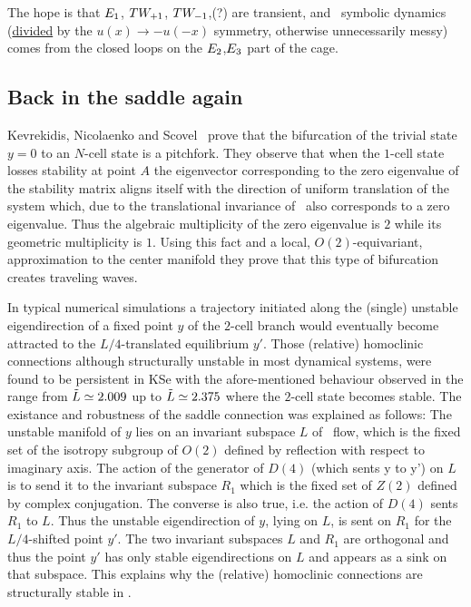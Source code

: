 The hope is that $E_{1}$, 
$TW_{+1}$,
$TW_{-1}$,(?) are transient, and \rpo\ symbolic
dynamics (\underline{divided} by the $u(x) \to - u(-x)$ symmetry, otherwise
unnecessarily messy) comes from the closed loops on 
the $E_{2}$,$E_{3}$ part of the cage.


\subsection{Back in the saddle again}

Kevrekidis, Nicolaenko and Scovel~ 
prove that the bifurcation of the trivial state $y=0$ to an $N$-cell state is a pitchfork. 
They observe that when the $1$-cell state losses stability at point $A$ the
eigenvector corresponding to the zero eigenvalue of the stability matrix aligns itself with the direction of uniform translation of the
system which, due to the translational invariance of \KSe\, also corresponds to a zero eigenvalue. Thus the algebraic multiplicity of the zero eigenvalue is $2$ while its geometric multiplicity is $1$. Using this fact and a local, $O(2)$-equivariant, approximation to the center manifold they prove that this type of bifurcation creates traveling waves.

In typical numerical simulations  a trajectory initiated along the (single) unstable eigendirection of a
fixed point $y$ of the $2$-cell branch would eventually become attracted to the $L/4$-translated equilibrium $y'$. 
Those (relative) homoclinic connections 
 although structurally unstable in most dynamical systems, were found to be persistent in KSe with the afore-mentioned behaviour observed in the range  
from $\tilde{L}\simeq 2.009$ up to $\tilde{L}\simeq 2.375$  where the $2$-cell state becomes stable. The existance and
robustness of the saddle connection was explained as follows:  The unstable manifold of $y$ lies on an invariant subspace $L$ of
\KS\ flow, which is the fixed set of the isotropy subgroup of $O(2)$ defined by reflection with respect to imaginary axis. The action of the generator of $D(4)$ (which sents y to y') on $L$ is to send it to the invariant subspace $R_{1}$ which is the fixed set of $Z(2)$ defined by complex
conjugation. The converse is also true, i.e. the action of $D(4)$ sents $R_{1}$ to $L$. Thus the unstable eigendirection of $y$, lying on $L$, is sent on $R_{1}$ for the $L/4$-shifted point $y'$. The two invariant subspaces $L$ and $R_{1}$ are orthogonal and thus the point $y'$ has only stable eigendirections on $L$ and appears as a sink on that subspace. This explains why the (relative) homoclinic connections are structurally stable in \KSe.

